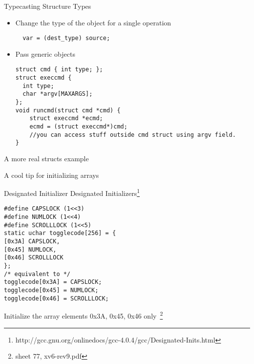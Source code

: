 \documentclass[10pt]{beamer}
\begin{document}
\begin{frame}[fragile]{Typecasting Structure Types}
\begin{itemize}
\item<1-> Change the type of the object for a single operation
\begin{verbatim}
  var = (dest_type) source;
\end{verbatim}
\item<2-> Pass generic objects
\begin{verbatim}
struct cmd { int type; };
struct execcmd {
  int type;
  char *argv[MAXARGS];
};
void runcmd(struct cmd *cmd) {
    struct execcmd *ecmd;
    ecmd = (struct execcmd*)cmd;
    //you can access stuff outside cmd struct using argv field.
}
\end{verbatim}
\end{itemize}
\end{frame}

\begin{frame}[standout]
  A more real structs example
\end{frame}


\begin{frame}[standout]
A cool tip for initializing arrays 
\end{frame}
  

\begin{frame}[fragile]{Designated Initializer}
Designated Initializers\footnote{http://gcc.gnu.org/onlinedocs/gcc-4.0.4/gcc/Designated-Inits.html}
\begin{verbatim}
#define CAPSLOCK (1<<3) 
#define NUMLOCK (1<<4)
#define SCROLLLOCK (1<<5)
static uchar togglecode[256] = {
[0x3A] CAPSLOCK,
[0x45] NUMLOCK,
[0x46] SCROLLLOCK
};
/* equivalent to */
togglecode[0x3A] = CAPSLOCK;
togglecode[0x45] = NUMLOCK;
togglecode[0x46] = SCROLLLOCK;
\end{verbatim}
Initialize the array elements 0x3A, 0x45, 0x46 only~\footnote{sheet 77, xv6-rev9.pdf}
\end{frame}
\end{document}
